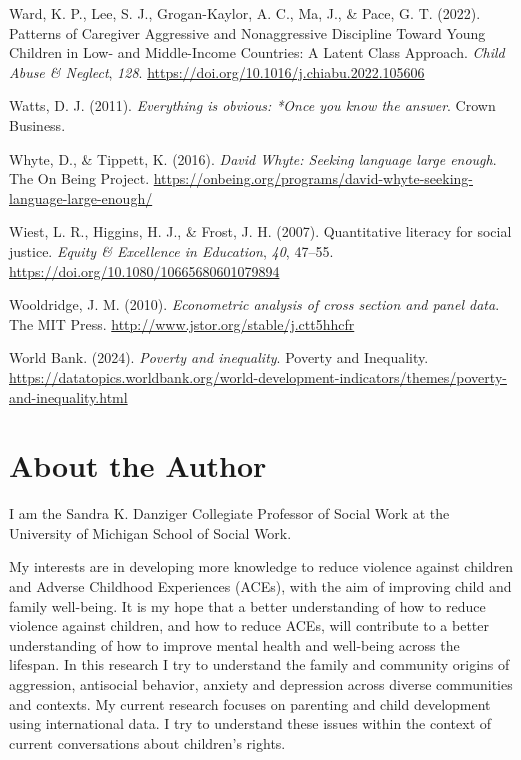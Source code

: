 \documentclass[
  letterpaper,
  DIV=11,
  numbers=noendperiod]{scrreprt}
\newlength{\cslhangindent}
\newenvironment{CSLReferences}[2] %
 {\begin{list}{}{%
  \setlength{\itemindent}{0pt}
  \setlength{\leftmargin}{0pt}
  \setlength{\parsep}{0pt}
  \ifodd #1
   \setlength{\leftmargin}{\cslhangindent}
   \setlength{\itemindent}{-1\cslhangindent}
  \fi
  \setlength{\itemsep}{#2\baselineskip}}}
 {\end{list}}
\begin{document}
\begin{CSLReferences}{1}{0}
Ward, K. P., Lee, S. J., Grogan-Kaylor, A. C., Ma, J., \& Pace, G. T.
(2022). {Patterns of Caregiver Aggressive and Nonaggressive Discipline
Toward Young Children in Low- and Middle-Income Countries: A Latent
Class Approach}. \emph{Child Abuse \& Neglect}, \emph{128}.
\url{https://doi.org/10.1016/j.chiabu.2022.105606}

Watts, D. J. (2011). \emph{Everything is obvious: *Once you know the
answer}. Crown Business.

Whyte, D., \& Tippett, K. (2016). \emph{{D}avid {W}hyte: Seeking
language large enough}. The On Being Project.
\url{https://onbeing.org/programs/david-whyte-seeking-language-large-enough/}

Wiest, L. R., Higgins, H. J., \& Frost, J. H. (2007). Quantitative
literacy for social justice. \emph{Equity \& Excellence in Education},
\emph{40}, 47--55. \url{https://doi.org/10.1080/10665680601079894}

Wooldridge, J. M. (2010). \emph{Econometric analysis of cross section
and panel data}. The MIT Press.
\url{http://www.jstor.org/stable/j.ctt5hhcfr}

World Bank. (2024). \emph{Poverty and inequality}. Poverty and
Inequality.
\url{https://datatopics.worldbank.org/world-development-indicators/themes/poverty-and-inequality.html}

\end{CSLReferences}


\chapter{About the Author}\label{about-the-author}

I am the Sandra K. Danziger Collegiate Professor of Social Work at the
University of Michigan School of Social Work.

My interests are in developing more knowledge to reduce violence against
children and Adverse Childhood Experiences (ACEs), with the aim of
improving child and family well-being. It is my hope that a better
understanding of how to reduce violence against children, and how to
reduce ACEs, will contribute to a better understanding of how to improve
mental health and well-being across the lifespan. In this research I try
to understand the family and community origins of aggression, antisocial
behavior, anxiety and depression across diverse communities and
contexts. My current research focuses on parenting and child development
using international data. I try to understand these issues within the
context of current conversations about children's rights.
\end{document}
